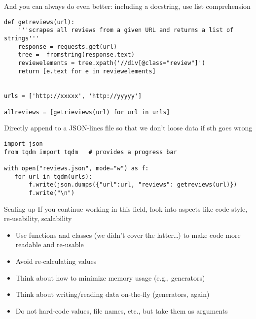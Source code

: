 \documentclass[compress]{beamer}
\begin{document}
\begin{frame}
And you can always do even better: including a docstring, use list comprehension
\begin{verbatim}
def getreviews(url):
    '''scrapes all reviews from a given URL and returns a list of strings'''
    response = requests.get(url)
    tree =  fromstring(response.text)
    reviewelements = tree.xpath('//div[@class="review"]')
    return [e.text for e in reviewelements]


urls = ['http://xxxxx', 'http://yyyyy']

allreviews = [getrieviews(url) for url in urls]
\end{verbatim}
\end{frame}





\begin{frame}
Directly append to a JSON-lines file so that we don't loose data if sth goes wrong
\begin{verbatim}
import json
from tqdm import tqdm   # provides a progress bar

with open("reviews.json", mode="w") as f:
   for url in tqdm(urls):
       f.write(json.dumps({"url":url, "reviews": getreviews(url)})
       f.write("\n")
\end{verbatim}
\end{frame}




\begin{frame}{Scaling up}
	If you continue working in this field, look into aspects like code style, re-usability, scalability
	\begin{itemize}
		\item Use functions and classes (we didn't cover the latter\ldots) to make code more readable and re-usable
		\item Avoid re-calculating values
		\item Think about how to minimize memory usage (e.g., generators)
		\item Think about writing/reading data on-the-fly (generators, again)
		\item Do not hard-code values, file names, etc., but take them as arguments
	\end{itemize}	
\end{frame}
\end{document}
